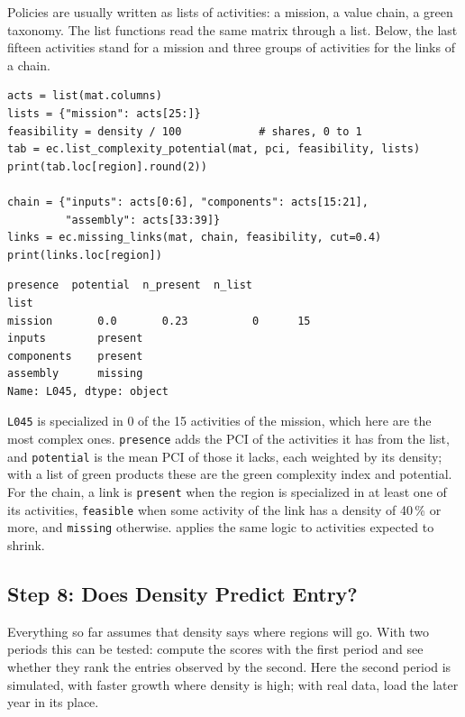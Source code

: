 Policies are usually written as lists of activities: a mission,
a value chain, a green taxonomy. The list functions read the same matrix
through a list. Below, the last fifteen activities stand for a mission
and three groups of activities for the links of a chain.

\begin{lstlisting}
acts = list(mat.columns)
lists = {"mission": acts[25:]}
feasibility = density / 100            # shares, 0 to 1
tab = ec.list_complexity_potential(mat, pci, feasibility, lists)
print(tab.loc[region].round(2))

chain = {"inputs": acts[0:6], "components": acts[15:21],
         "assembly": acts[33:39]}
links = ec.missing_links(mat, chain, feasibility, cut=0.4)
print(links.loc[region])
\end{lstlisting}
\begin{lstlisting}[language={}, numbers=none, backgroundcolor=\color{white}, frame=leftline, framerule=2pt, rulecolor=\color{noteborder}, xleftmargin=1.5em]
         presence  potential  n_present  n_list
list                                           
mission       0.0       0.23          0      15
inputs        present
components    present
assembly      missing
Name: L045, dtype: object
\end{lstlisting}

\texttt{L045} is specialized in
0 of the
15 activities of the
mission, which here are the most complex ones. \texttt{presence} adds
the PCI of the activities it has from the list, and \texttt{potential}
is the mean PCI of those it lacks, each weighted by its density; with a list of green products these are the green
complexity index and potential. For the chain, a link is
\texttt{present} when the region is specialized in at least one of its
activities, \texttt{feasible} when some activity of the link has a
density of 40\,\% or more, and \texttt{missing} otherwise.
 applies the same logic to activities expected to
shrink.

\subsection{Step 8: Does Density Predict Entry?}

Everything so far assumes that density says where regions will
go. With two periods this can be tested: compute the scores with the
first period and see whether they rank the entries observed by the
second. Here the second period is simulated, with faster growth where
density is high; with real data, load the later year in its place.

